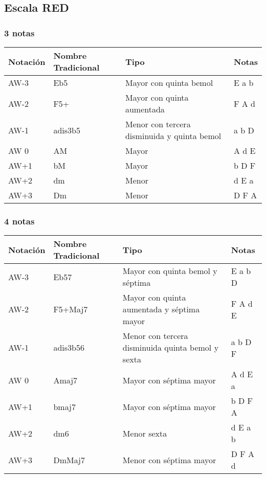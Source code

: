 \documentclass[]{article}
\begin{document}
\subsection*{Escala RED}

\subsubsection*{3 notas}

\begin{table}[H]
  \centering
  \begin{tabularx}{\textwidth}{ll>{\raggedright\arraybackslash}Xl}
\toprule
Notación & Nombre Tradicional & Tipo & Notas \\
\midrule
\textsf{AW-3} & Eb5     & Mayor con quinta bemol & E a b \\
\textsf{AW-2} & F5+     & Mayor con quinta aumentada & F A d \\
\textsf{AW-1} & adis3b5 & Menor con tercera disminuida y quinta bemol & a b D \\
\textsf{AW 0} & AM      & Mayor & A d E \\
\textsf{AW+1} & bM      & Mayor & b D F \\
\textsf{AW+2} & dm      & Menor & d E a \\
\textsf{AW+3} & Dm      & Menor & D F A \\ 
\bottomrule
\end{tabularx}
\end{table}

\subsubsection*{4 notas}
\begin{table}[H]
  \centering
  \begin{tabularx}{\textwidth}{ll>{\raggedright\arraybackslash}Xl}
\toprule
Notación & Nombre Tradicional & Tipo & Notas \\
\midrule
\textsf{AW-3} & Eb57     & Mayor con quinta bemol y séptima & E a b D\\
\textsf{AW-2} & F5+Maj7  & Mayor con quinta aumentada y séptima mayor & F A d E\\
\textsf{AW-1} & adis3b56 & Menor con tercera disminuida quinta bemol y sexta & a b D F\\
\textsf{AW 0} & Amaj7    & Mayor con séptima mayor & A d E a \\
\textsf{AW+1} & bmaj7    & Mayor con séptima mayor & b D F A \\
\textsf{AW+2} & dm6      & Menor sexta & d E a b \\
\textsf{AW+3} & DmMaj7   & Menor con séptima mayor & D F A d \\ 
\bottomrule
\end{tabularx}
\end{table}
\end{document}
